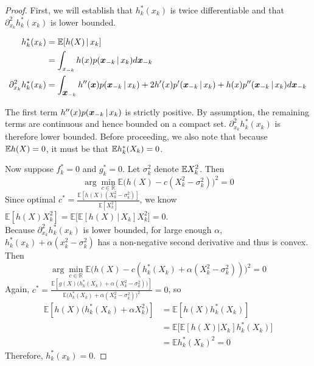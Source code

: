 \begin{proof}


First, we will establish that $h^*_k(x_k)$ is twice differentiable and that $\partial^2_{x_k} h^*_k(x_k)$ is lower bounded. 

\begin{align*}
h^*_k(x_k) &= {\mathbb E}[ h(X) {\,|\,} x_k] \\
  &= \int_{x_{-k}} h(x) p(\mbox{\boldmath $x$}_{-k} {\,|\,} x_k) d \mbox{\boldmath $x$}_{-k}\\
\partial^2_{x_k} h^*_k(x_k) 
  &= \int_{\mbox{\boldmath $x$}_{-k}} h''(\mbox{\boldmath $x$}) p(\mbox{\boldmath $x$}_{-k} {\,|\,} x_k) +
  2 h'(x) p'(\mbox{\boldmath $x$}_{-k} {\,|\,} x_k) + h(x) p''(\mbox{\boldmath $x$}_{-k} {\,|\,} x_k) 
  d\mbox{\boldmath $x$}_{-k} 
\end{align*}

The first term $h''(x) p(\mbox{\boldmath $x$}_{-k} {\,|\,} x_k)$ is strictly positive. By assumption, the remaining terms are continuous and hence bounded on a compact set. $\partial^2_{x_k} h^*_k(x_k)$ is therefore lower bounded. Before proceeding, we also note that because ${\mathbb E} h(X) = 0$, it must be that ${\mathbb E} h^*_k(X_k) = 0$.

Now suppose $f^*_k = 0$ and $g^*_k = 0$. Let $\sigma_k^2$ denote ${\mathbb E} X_k^2$. Then 
\begin{equation}
\arg\min_{c \in \mathbb{R}} \mathbb{E}\Big( h(X) - c (X_k^2-\sigma_k^2) \Big)^2 = 0
\end{equation}
Since optimal $c^* = \frac{\mathbb{E} [ h(X) (X_k^2-\sigma_k^2) ]}{\mathbb{E}[ X_k^2 ]}$, 
we know $\mathbb{E} [ h(X) X_k^2 ] = 
\mathbb{E} \Big[ \mathbb{E}[ h(X) \,|\, X_k] X_k^2 \Big] = 0$.\\

Because $\partial^2_{x_k} h^*_k(x_k)$ is lower bounded, for large enough $\alpha$, $h^*_k(x_k) + \alpha (x_k^2 - \sigma_k^2)$ has a non-negative second derivative and thus is convex. Then
\begin{equation}
\arg\min_{c \in \mathbb{R}} \mathbb{E}\Big( h(X) 
       - c (h^*_k(X_k) + \alpha (X_k^2 - \sigma_k^2)) \Big)^2 = 0
\end{equation}
Again, $c^* = \frac{\mathbb{E}[g(X)\big( 
            h^*_k(X_k) + \alpha (X_k^2 - \sigma_k^2) \big)]}{\mathbb{E}
        \big( h^*_k(X_k) + \alpha (X_k^2 - \sigma_k^2) \big)^2} = 0$, so
\begin{align*}
\mathbb{E}[ h(X) \big( h^*_k(X_k) + \alpha X_k^2 \big) ] &= 
\mathbb{E}[ h(X) h^*_k(X_k) ] \\
& = \mathbb{E}\Big[ \mathbb{E}[h(X) | X_k]  h^*_k(X_k) \Big] \\
& = \mathbb{E} h^*_k(X_k)^2 = 0
\end{align*}
Therefore, $h^*_k(x_k) = 0$.

\end{proof}


